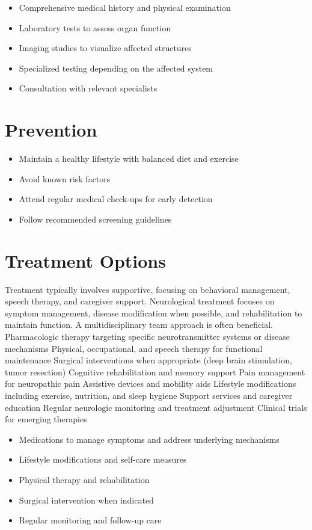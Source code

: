 \begin{itemize}[noitemsep]
  \item Comprehensive medical history and physical examination
  \item Laboratory tests to assess organ function
  \item Imaging studies to visualize affected structures
  \item Specialized testing depending on the affected system
  \item Consultation with relevant specialists
\end{itemize}
\section{Prevention}
\begin{itemize}[noitemsep]
  \item Maintain a healthy lifestyle with balanced diet and exercise
  \item Avoid known risk factors
  \item Attend regular medical check-ups for early detection
  \item Follow recommended screening guidelines
\end{itemize}
\section{Treatment Options}
Treatment typically involves supportive, focusing on behavioral management, speech therapy, and caregiver support. Neurological treatment focuses on symptom management, disease modification when possible, and rehabilitation to maintain function. A multidisciplinary team approach is often beneficial. Pharmacologic therapy targeting specific neurotransmitter systems or disease mechanisms Physical, occupational, and speech therapy for functional maintenance Surgical interventions when appropriate (deep brain stimulation, tumor resection) Cognitive rehabilitation and memory support Pain management for neuropathic pain Assistive devices and mobility aids Lifestyle modifications including exercise, nutrition, and sleep hygiene Support services and caregiver education Regular neurologic monitoring and treatment adjustment Clinical trials for emerging therapies

\begin{itemize}[noitemsep]
  \item Medications to manage symptoms and address underlying mechanisms
  \item Lifestyle modifications and self-care measures
  \item Physical therapy and rehabilitation
  \item Surgical intervention when indicated
  \item Regular monitoring and follow-up care
\end{itemize}
